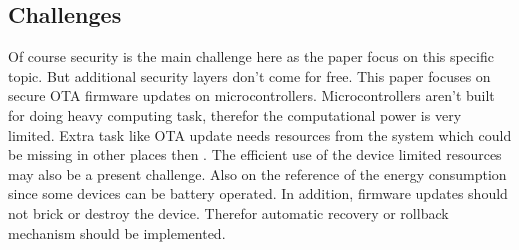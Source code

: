 \subsection{Challenges}
Of course security is the main challenge here as the paper focus on this specific topic. But additional security layers don't come for free. This paper focuses on secure OTA firmware updates on microcontrollers. Microcontrollers aren't built for doing heavy computing task, therefor the computational power is very limited. Extra task like OTA update needs resources from the system which could be missing in other places then \cite{Kolehmainen2018}. The efficient use of the device limited resources may also be a present challenge. Also on the reference of the energy consumption since some devices can be battery operated. In addition, firmware updates should not brick or destroy the device. Therefor automatic recovery or rollback mechanism should be implemented.
